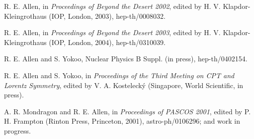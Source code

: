\documentclass{ws-procs9x6}
\begin{document}
\begin{thebibliography}{9}

  R. E. Allen, in \textit{Proceedings of Beyond the
Desert 2002}, edited by H. V. Klapdor-Kleingrothaus (IOP, London, 2003),
hep-th/0008032.

  R. E. Allen, in \textit{Proceedings of Beyond the
Desert 2003}, edited by H. V. Klapdor-Kleingrothaus (IOP, London, 2004),
hep-th/0310039.

  R. E. Allen and S. Yokoo, Nuclear Physics B
Suppl. (in press), hep-th/0402154.

  R. E. Allen and S. Yokoo, in \textit{Proceedings
of the Third Meeting on CPT and Lorentz Symmetry}, edited by V. A.
Kosteleck\'{y} (Singapore, World Scientific, in press).

  A. R. Mondragon and R. E. Allen, in
\textit{Proceedings of PASCOS 2001}, edited by P. H. Frampton (Rinton Press,
Princeton, 2001), astro-ph/0106296; and work in progress.

\end{thebibliography}
\end{document}
